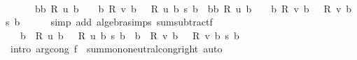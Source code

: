 \begin{isabellebody}
\ \ \isamarkupfalse%
\ \isamarkupfalse%
\ {\isachardoublequoteopen}{\isachardot}{\kern0pt}{\isachardot}{\kern0pt}{\isachardot}{\kern0pt}\ {\isacharequal}{\kern0pt}\isanewline
\ \ \ \ \ \ {\isacharparenleft}{\kern0pt}{\isasymSum}b{\isasymin}{\isacharbraceleft}{\kern0pt}b{\isachardot}{\kern0pt}\ {\isacharquery}{\kern0pt}R\ u\ b\ {\isasymnoteq}\ {}{\isacharbraceright}{\kern0pt}\ {\isasymunion}\ {\isacharbraceleft}{\kern0pt}b{\isachardot}{\kern0pt}\ {\isacharquery}{\kern0pt}R\ v\ b\ {\isasymnoteq}\ {}{\isacharbraceright}{\kern0pt}{\isachardot}{\kern0pt}\ {\isacharquery}{\kern0pt}R\ u\ b\ {\isacharasterisk}{\kern0pt}s\ b{\isacharparenright}{\kern0pt}\ {\isacharminus}{\kern0pt}\ {\isacharparenleft}{\kern0pt}{\isasymSum}b{\isasymin}{\isacharbraceleft}{\kern0pt}b{\isachardot}{\kern0pt}\ {\isacharquery}{\kern0pt}R\ u\ b\ {\isasymnoteq}\ {}{\isacharbraceright}{\kern0pt}\ {\isasymunion}\ {\isacharbraceleft}{\kern0pt}b{\isachardot}{\kern0pt}\ {\isacharquery}{\kern0pt}R\ v\ b\ {\isasymnoteq}\ {}{\isacharbraceright}{\kern0pt}{\isachardot}{\kern0pt}\ {\isacharquery}{\kern0pt}R\ v\ b\ {\isacharasterisk}{\kern0pt}s\ b{\isacharparenright}{\kern0pt}{\isachardoublequoteclose}\isanewline
\ \ \ \ \isamarkupfalse%
\ {\isacharparenleft}{\kern0pt}simp\ add{\isacharcolon}{\kern0pt}\ algebra{\isacharunderscore}{\kern0pt}simps\ sum{\isacharunderscore}{\kern0pt}subtractf{\isacharparenright}{\kern0pt}\isanewline
\ \ \isamarkupfalse%
\ \isamarkupfalse%
\ {\isachardoublequoteopen}{\isachardot}{\kern0pt}{\isachardot}{\kern0pt}{\isachardot}{\kern0pt}\ {\isacharequal}{\kern0pt}\ {\isacharparenleft}{\kern0pt}{\isasymSum}b\ {\isacharbar}{\kern0pt}\ {\isacharquery}{\kern0pt}R\ u\ b\ {\isasymnoteq}\ {}{\isachardot}{\kern0pt}\ {\isacharquery}{\kern0pt}R\ u\ b\ {\isacharasterisk}{\kern0pt}s\ b{\isacharparenright}{\kern0pt}\ {\isacharminus}{\kern0pt}\ {\isacharparenleft}{\kern0pt}{\isasymSum}b\ {\isacharbar}{\kern0pt}\ {\isacharquery}{\kern0pt}R\ v\ b\ {\isasymnoteq}\ {}{\isachardot}{\kern0pt}\ {\isacharquery}{\kern0pt}R\ v\ b\ {\isacharasterisk}{\kern0pt}s\ b{\isacharparenright}{\kern0pt}{\isachardoublequoteclose}\isanewline
\ \ \ \ \isamarkupfalse%
\ {\isacharparenleft}{\kern0pt}intro\ arg{\isacharunderscore}{\kern0pt}cong{}{\isacharbrackleft}{\kern0pt}\ f{\isacharequal}{\kern0pt}\ {\isachardoublequoteopen}{\isacharparenleft}{\kern0pt}{\isacharminus}{\kern0pt}{\isacharparenright}{\kern0pt}{\isachardoublequoteclose}{\isacharbrackright}{\kern0pt}\ sum{\isachardot}{\kern0pt}mono{\isacharunderscore}{\kern0pt}neutral{\isacharunderscore}{\kern0pt}cong{\isacharunderscore}{\kern0pt}right{\isacharparenright}{\kern0pt}\ auto\isanewline

\end{isabellebody}
